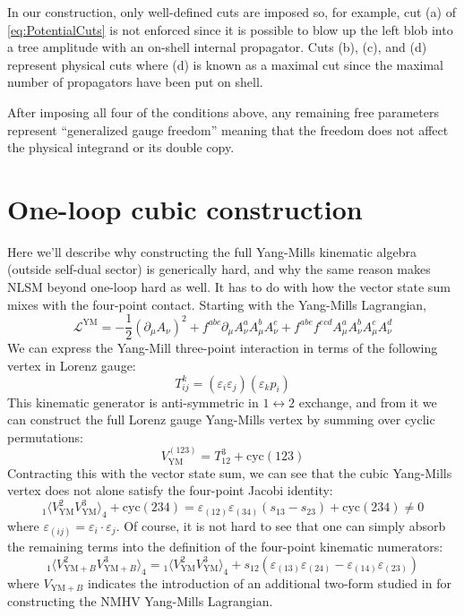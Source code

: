 \documentclass[11pt,letter]{article}
\def\be{\begin{equation}}
\def\ee{\end{equation}}
\begin{document}
In our construction, only well-defined cuts are imposed so, for
example, cut (a) of \cref{eq:PotentialCuts} is not enforced since it
is possible to blow up the left blob into a tree amplitude with an
on-shell internal propagator.  Cuts (b), (c), and (d) represent
physical cuts where (d) is known as a maximal cut since the maximal
number of propagators have been put on shell.
\fi

After imposing all four of the conditions above, any remaining free
parameters represent ``generalized gauge freedom'' meaning that the
freedom does not affect the physical integrand or its double copy.

\section{One-loop cubic construction}
\label{sec:cubic}
Here we'll describe why constructing the full Yang-Mills kinematic algebra (outside self-dual sector) is generically hard, and why the same reason makes NLSM beyond one-loop hard as well. It has to do with how the vector state sum mixes with the four-point contact. Starting with the Yang-Mills Lagrangian,
\be
\mathcal{L}^{\text{YM}} = -\frac{1}{2}(\partial_\mu A_\nu)^2 + f^{abc} \partial_\mu A^a_\nu A^b_\mu A^c_\nu + f^{abe}f^{ecd}A^a_\mu A^b_\nu  A^c_\mu A^d_\nu 
\ee
We can express the Yang-Mill three-point interaction in terms of the following vertex in Lorenz gauge:
\be
T^k_{ij} = (\varepsilon_i\varepsilon_j)(\varepsilon_k p_i)
\ee
This kinematic generator is anti-symmetric in $1\leftrightarrow 2$ exchange, and from it we can construct the full Lorenz gauge Yang-Mills vertex by summing over cyclic permutations:
\be
V^{(123)}_{\text{YM}} = T^3_{12} +\text{cyc}(123)
\ee
Contracting this with the vector state sum, we can see that the cubic Yang-Mills vertex does not alone satisfy the four-point Jacobi identity:
\be\label{cubicJac}
{}_1\langle V^{2}_{\text{YM}}V^{3}_{\text{YM}}\rangle_4+\text{cyc}(234) = \varepsilon_{(12)}  \varepsilon_{(34)} (s_{13}-s_{23}) +\text{cyc}(234) \neq 0
\ee
where $ \varepsilon_{(ij)} =  \varepsilon_{i}\cdot  \varepsilon_{j}$. Of course, it is not hard to see that one can simply absorb the remaining terms into the definition of the four-point kinematic numerators:
\be
{}_1\langle V^{2}_{\text{YM}+B}V^{3}_{\text{YM}+B}\rangle_4 = {}_1\langle V^{2}_{\text{YM}}V^{3}_{\text{YM}}\rangle_4 + s_{12} (\varepsilon_{(13)}\varepsilon_{(24)}-\varepsilon_{(14)}\varepsilon_{(23)})
\ee
where $V_{\text{YM}+B}$ indicates the introduction of an additional two-form studied in \cite{Ben-Shahar:2022ixa} for constructing the NMHV Yang-Mills Lagrangian. 
\end{document}
